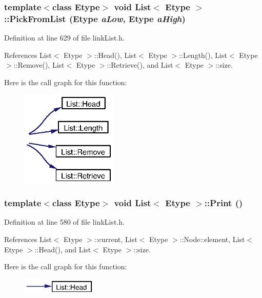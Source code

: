 \subsubsection{\setlength{\rightskip}{0pt plus 5cm}template$<$class Etype$>$ void {\bf List}$<$ Etype $>$::Pick\-From\-List (Etype {\em a\-Low}, Etype {\em a\-High})}\label{classList_a20}




Definition at line 629 of file link\-List.h.

References List$<$ Etype $>$::Head(), List$<$ Etype $>$::Length(), List$<$ Etype $>$::Remove(), List$<$ Etype $>$::Retrieve(), and List$<$ Etype $>$::size.

Here is the call graph for this function:\begin{figure}[H]
\begin{center}
\leavevmode
\includegraphics[width=129pt]{classList_a20_cgraph}
\end{center}
\end{figure}
\subsubsection{\setlength{\rightskip}{0pt plus 5cm}template$<$class Etype$>$ void {\bf List}$<$ Etype $>$::Print ()}\label{classList_a18}




Definition at line 580 of file link\-List.h.

References List$<$ Etype $>$::current, List$<$ Etype $>$::Node::element, List$<$ Etype $>$::Head(), and List$<$ Etype $>$::size.

Here is the call graph for this function:\begin{figure}[H]
\begin{center}
\leavevmode
\includegraphics[width=101pt]{classList_a18_cgraph}
\end{center}
\end{figure}
